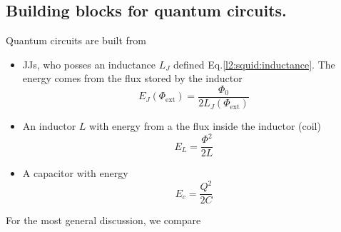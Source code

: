    \subsection{Building blocks for quantum circuits.}
   Quantum circuits are built from
   \begin{itemize}
   \item JJs,  who posses an inductance  $L_J$ defined Eq.\eqref{l2:squid:inductance}.   The energy comes from  the flux
     stored by the inductor
     \begin{equation}
       E_J(\Phi_\text{ext}) = \frac{\Phi_0}{2L_J(\Phi_\text{ext})}
     \end{equation}
   \item An inductor $L$ with energy from a the flux inside the inductor (coil)
     \begin{equation}
       E_L = \frac{\Phi^2}{2L}
     \end{equation}
   \item A capacitor with energy
     \begin{equation}
       E_c = \frac{Q^2}{2C}
     \end{equation}
   \end{itemize}

   For the most general discussion, we compare

